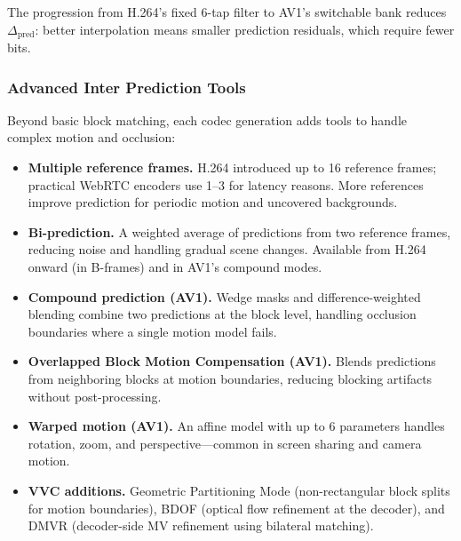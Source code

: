 The progression from H.264's fixed 6-tap filter to AV1's switchable bank
reduces $\Delta_{\text{pred}}$: better interpolation means smaller
prediction residuals, which require fewer bits.

\subsubsection{Advanced Inter Prediction Tools}
\label{sec:advanced-inter}

Beyond basic block matching, each codec generation adds tools to handle
complex motion and occlusion:

\begin{itemize}
\item \textbf{Multiple reference frames.} H.264 introduced up to 16
  reference frames; practical WebRTC encoders use 1--3 for latency reasons.
  More references improve prediction for periodic motion and uncovered
  backgrounds.

\item \textbf{Bi-prediction.} A weighted average of predictions from two
  reference frames, reducing noise and handling gradual scene changes.
  Available from H.264 onward (in B-frames) and in AV1's compound modes.

\item \textbf{Compound prediction (AV1).} Wedge masks and
  difference-weighted blending combine two predictions at the block level,
  handling occlusion boundaries where a single motion model fails.

\item \textbf{Overlapped Block Motion Compensation (AV1).} Blends
  predictions from neighboring blocks at motion boundaries, reducing
  blocking artifacts without post-processing.

\item \textbf{Warped motion (AV1).} An affine model with up to 6
  parameters handles rotation, zoom, and perspective---common in
  screen sharing and camera motion.

\item \textbf{VVC additions.} Geometric Partitioning Mode (non-rectangular
  block splits for motion boundaries), BDOF (optical flow refinement at the
  decoder), and DMVR (decoder-side MV refinement using bilateral matching).
\end{itemize}


